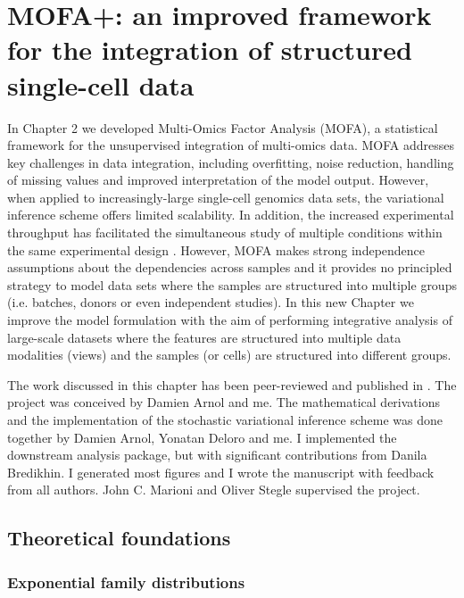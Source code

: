 \graphicspath{{Chapter4/Figs/simulations/}{Chapter4/Figs/scrna/}{Chapter4/Figs/scmet/}{Chapter4/Figs/scnmt/}}

\chapter{MOFA+: an improved framework for the integration of structured single-cell data}

In Chapter 2 we developed Multi-Omics Factor Analysis (MOFA), a statistical framework for the unsupervised integration of multi-omics data. MOFA addresses key challenges in data integration, including overfitting, noise reduction, handling of missing values and improved interpretation of the model output. However, when applied to increasingly-large single-cell genomics data sets, the variational inference scheme offers limited scalability. In addition, the increased experimental throughput has facilitated the simultaneous study of multiple conditions within the same experimental design \cite{Replogle2020}. However, MOFA makes strong independence assumptions about the dependencies across samples and it provides no principled strategy to model data sets where the samples are structured into multiple groups (i.e. batches, donors or even independent studies). In this new Chapter we improve the model formulation with the aim of performing integrative analysis of large-scale datasets where the features are structured into multiple data modalities (views) and the samples (or cells) are structured into different groups.

The work discussed in this chapter has been peer-reviewed and published in \cite{Argelaguet2020}. The project was conceived by Damien Arnol and me. The mathematical derivations and the implementation of the stochastic variational inference scheme was done together by Damien Arnol, Yonatan Deloro and me. I implemented the downstream analysis package, but with significant contributions from Danila Bredikhin. I generated most figures and I wrote the manuscript with feedback from all authors. John C. Marioni and Oliver Stegle supervised the project. 

\section{Theoretical foundations}

\subsection{Exponential family distributions} \label{section:exponential_family}

